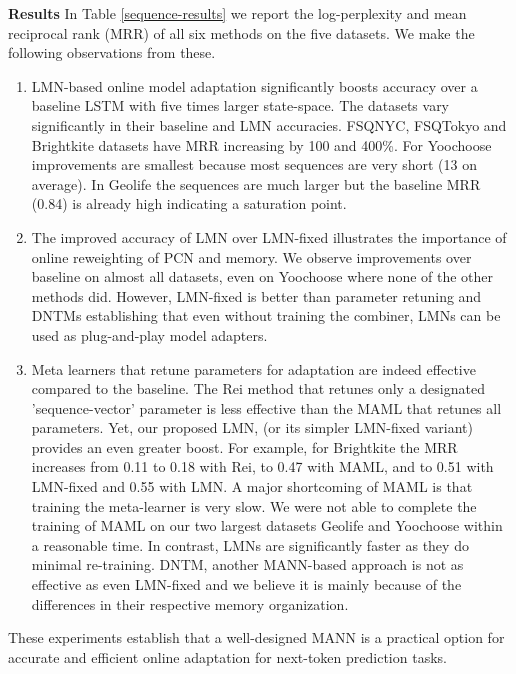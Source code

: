 \documentclass[letterpaper]{article} %
\begin{document}
\begin{table}[!htb]
\begin{center}
\begin{tabular}{|l|r|r|r|r|r|r|r|} \hline

\end{tabular}
\end{center}
\end{table}
{ \bf Results}
In Table \ref{sequence-results} we report the log-perplexity and mean reciprocal rank (MRR) of all six methods on the five datasets. We make the following observations from these.
\begin{enumerate}
\item LMN-based online model adaptation significantly boosts accuracy over a baseline LSTM with five times larger state-space.
The datasets vary significantly in their baseline and LMN accuracies. FSQNYC, FSQTokyo and Brightkite datasets have MRR increasing by 100 and 400\%.  For Yoochoose improvements are smallest because most sequences are very short (13 on average). In Geolife the sequences are much larger but the baseline MRR (0.84) is already high indicating a saturation point.
\item The improved accuracy of LMN over LMN-fixed illustrates the importance of online reweighting of PCN and memory. We observe improvements over baseline on almost all datasets, even on Yoochoose where none of the other methods did.  However, LMN-fixed is better than parameter retuning and DNTMs establishing that even without training the combiner, LMNs can be used as plug-and-play model adapters.
\item Meta learners that retune parameters for adaptation are indeed effective compared to the baseline.  The Rei method that retunes only a designated 'sequence-vector' parameter is less effective than the MAML that retunes all parameters. Yet, our proposed LMN, (or its simpler LMN-fixed variant) provides an even greater boost.  For example, for Brightkite the MRR increases from 0.11 to 0.18 with Rei, to 0.47 with MAML, and to 0.51 with LMN-fixed and 0.55 with LMN.
A major shortcoming of MAML is that training the meta-learner is very slow.  We were not able to complete the training of MAML on our two largest datasets Geolife and Yoochoose within a reasonable time. In contrast, LMNs are significantly faster as they do minimal re-training.
DNTM, another MANN-based approach is not as effective as even LMN-fixed and we believe it is mainly because of the differences in their respective memory organization.
\end{enumerate}
These experiments establish that a well-designed MANN is a practical option for accurate and efficient online adaptation for next-token prediction tasks.
\end{document}
